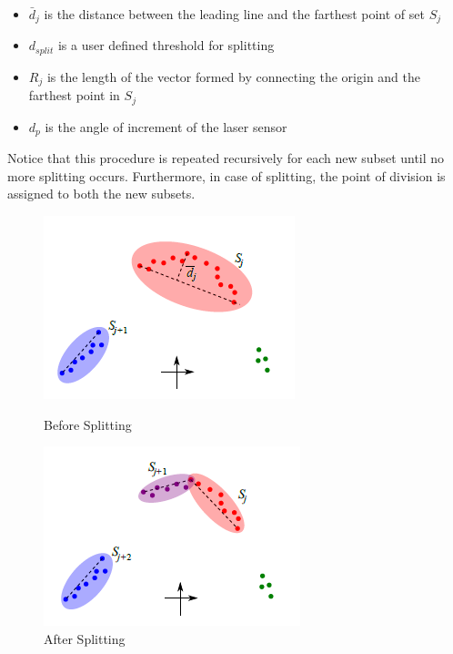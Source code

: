 \begin{itemize}
    \begin{itemize}
        \item \(\bar{d}_{j}\) is the distance between the leading line and the farthest point of set \(S_{j}\)
        \item \(d_{split}\) is a user defined threshold for splitting 
        \item \(R_{j}\) is the length of the vector formed by connecting the origin and the farthest point in \(S_{j}\)
        \item \(d_{p}\) is the angle of increment of the laser sensor
    \end{itemize}
    Notice that this procedure is repeated recursively for each new subset until no more splitting occurs. Furthermore, in case of splitting, the point of division is assigned to both the new subsets.
    \begin{center}
        \begin{figure}[H]
            \begin{minipage}{0.5\textwidth}
                \centering
                \includegraphics[scale=0.75]{images/detection/splitting-points-before.png}
                \caption{Before Splitting}
            \end{minipage}
            \begin{minipage}{0.5\textwidth}
                \centering
                \includegraphics[scale=0.75]{images/detection/splitting-points-after.png}
                \caption{After Splitting}
            \end{minipage}

\end{figure}
\end{center}
\end{itemize}
